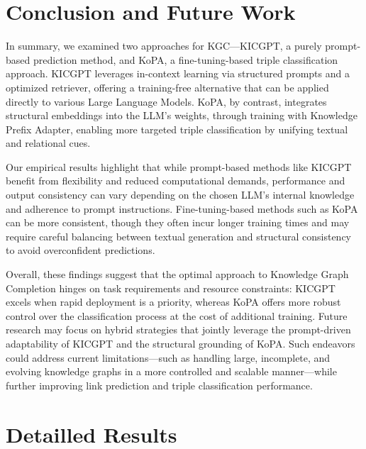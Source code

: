 \documentclass[12pt,a4paper]{article}
\begin{document}
%
%


\section{Conclusion and Future Work}\label{sec:conclusion-and-future-work}

In summary, we examined two approaches for KGC—KICGPT, a purely prompt-based prediction method, and KoPA, a fine-tuning-based triple classification approach.
KICGPT leverages in-context learning via structured prompts and a optimized retriever, offering a training-free alternative that can be applied directly to various Large Language Models.
KoPA, by contrast, integrates structural embeddings into the LLM's weights, through training with Knowledge Prefix Adapter, enabling more targeted triple classification by unifying textual and relational cues.

Our empirical results highlight that while prompt-based methods like KICGPT benefit from flexibility and reduced computational demands, performance and output consistency can vary depending on the chosen LLM's internal knowledge and adherence to prompt instructions.
Fine-tuning-based methods such as KoPA can be more consistent, though they often incur longer training times and may require careful balancing between textual generation and structural consistency to avoid overconfident predictions.

Overall, these findings suggest that the optimal approach to Knowledge Graph Completion hinges on task requirements and resource constraints: KICGPT excels when rapid deployment is a priority, whereas KoPA offers more robust control over the classification process at the cost of additional training.
Future research may focus on hybrid strategies that jointly leverage the prompt-driven adaptability of KICGPT and the structural grounding of KoPA. Such endeavors could address current limitations—such as handling large, incomplete, and evolving knowledge graphs in a more controlled and scalable manner—while further improving link prediction and triple classification performance.



\pagebreak
\appendix
\section{Detailled Results}
\end{document}
